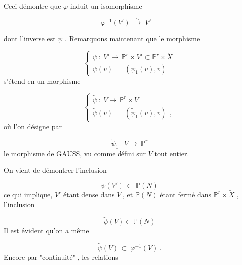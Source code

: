 Ceci démontre que $\varphi$ induit un isomorphisme

\begin{equation}\tag{3.6.12}
\varphi^{-1}(V') \; \stackrel{\sim}{\longrightarrow} \; V' \quad 
\end{equation}


 dont l'inverse est $\psi$ . Remarquons maintenant que le morphisme

\begin{equation}\tag{3.6.13}
\left\{ \begin{array}{l} \psi \ : \ V' \longrightarrow \ \mathbb{P}^r \times V' \subset \mathbb{P}^r \times \check{X} \\[2ex] \psi(v) \ = \ (\psi_1(v),v) \end{array} \right.
\end{equation}
s'étend en un morphisme

\begin{equation}\tag{3.6.14}
\left\{ \begin{array}{l} \widetilde{\psi} \ : \ V \longrightarrow \ \mathbb{P}^r \times V \\[2ex] \widetilde{\psi}(v) \ = \ (\widetilde{\psi}_1(v),v) \ \ , \end{array} \right.
\end{equation}
où l'on désigne par

\begin{equation}\tag{3.6.15}
\widetilde{\psi}_1 \ : \ V \longrightarrow \ \mathbb{P}^r
\end{equation}
le morphisme de GAUSS, vu comme défini sur $V$ tout entier.

On vient de démontrer l'inclusion

\begin{equation}\tag{3.6.16}
\psi(V') \ \subset \ \mathbb{P}(N)
\end{equation}
ce qui implique, $V'$ étant dense dans $V$ , et $\mathbb{P}(N)$ étant fermé dans $\mathbb{P}^r \times \check{X}$ , l'inclusion

\begin{equation}\tag{3.6.17}
\widetilde{\psi}(V) \subset \mathbb{P}(N)
\end{equation}
Il est évident qu'on a même

\begin{equation}\tag{3.6.18}
\widetilde{\psi}(V) \ \subset \ \varphi^{-1}(V) \ .
\end{equation}
Encore par "continuité" , les relations 


